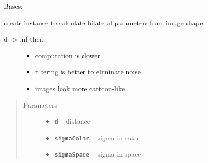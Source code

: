 \documentclass[letterpaper,10pt,english]{sphinxmanual}
\begin{document}
\begin{fulllineitems}
\label{RRtoolbox.lib.arrayops:RRtoolbox.lib.arrayops.filters.BilateralParameters}
Bases: 

create instance to calculate bilateral
parameters from image shape.
\begin{description}
\item[{d -\textgreater{} inf then:}] \leavevmode\begin{itemize}
\item {} 
computation is slower

\item {} 
filtering is better to eliminate noise

\item {} 
images look more cartoon-like

\end{itemize}

\end{description}
\begin{quote}\begin{description}
\item[{Parameters}] \leavevmode\begin{itemize}
\item {} 
\textbf{\texttt{d}} -- distance

\item {} 
\textbf{\texttt{sigmaColor}} -- sigma in color

\item {} 
\textbf{\texttt{sigmaSpace}} -- sigma in space

\end{itemize}

\end{description}\end{quote}

\begin{fulllineitems}
\label{RRtoolbox.lib.arrayops:RRtoolbox.lib.arrayops.filters.BilateralParameters.d}
\end{fulllineitems}


\begin{fulllineitems}
\label{RRtoolbox.lib.arrayops:RRtoolbox.lib.arrayops.filters.BilateralParameters.d_h}
\end{fulllineitems}


\end{fulllineitems}
\end{document}
